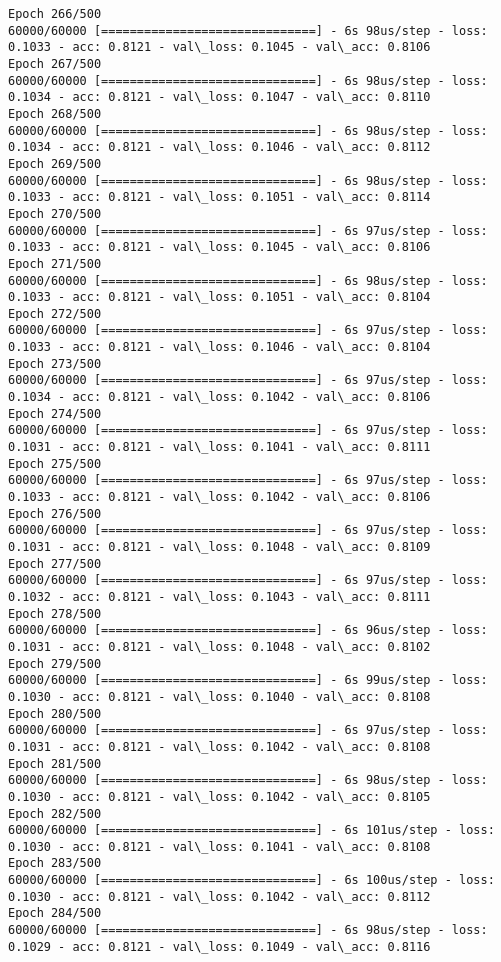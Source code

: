 \documentclass[11pt]{article}
\begin{document}
\begin{Verbatim}[commandchars=\\\{\}]
Epoch 266/500
60000/60000 [==============================] - 6s 98us/step - loss: 0.1033 - acc: 0.8121 - val\_loss: 0.1045 - val\_acc: 0.8106
Epoch 267/500
60000/60000 [==============================] - 6s 98us/step - loss: 0.1034 - acc: 0.8121 - val\_loss: 0.1047 - val\_acc: 0.8110
Epoch 268/500
60000/60000 [==============================] - 6s 98us/step - loss: 0.1034 - acc: 0.8121 - val\_loss: 0.1046 - val\_acc: 0.8112
Epoch 269/500
60000/60000 [==============================] - 6s 98us/step - loss: 0.1033 - acc: 0.8121 - val\_loss: 0.1051 - val\_acc: 0.8114
Epoch 270/500
60000/60000 [==============================] - 6s 97us/step - loss: 0.1033 - acc: 0.8121 - val\_loss: 0.1045 - val\_acc: 0.8106
Epoch 271/500
60000/60000 [==============================] - 6s 98us/step - loss: 0.1033 - acc: 0.8121 - val\_loss: 0.1051 - val\_acc: 0.8104
Epoch 272/500
60000/60000 [==============================] - 6s 97us/step - loss: 0.1033 - acc: 0.8121 - val\_loss: 0.1046 - val\_acc: 0.8104
Epoch 273/500
60000/60000 [==============================] - 6s 97us/step - loss: 0.1034 - acc: 0.8121 - val\_loss: 0.1042 - val\_acc: 0.8106
Epoch 274/500
60000/60000 [==============================] - 6s 97us/step - loss: 0.1031 - acc: 0.8121 - val\_loss: 0.1041 - val\_acc: 0.8111
Epoch 275/500
60000/60000 [==============================] - 6s 97us/step - loss: 0.1033 - acc: 0.8121 - val\_loss: 0.1042 - val\_acc: 0.8106
Epoch 276/500
60000/60000 [==============================] - 6s 97us/step - loss: 0.1031 - acc: 0.8121 - val\_loss: 0.1048 - val\_acc: 0.8109
Epoch 277/500
60000/60000 [==============================] - 6s 97us/step - loss: 0.1032 - acc: 0.8121 - val\_loss: 0.1043 - val\_acc: 0.8111
Epoch 278/500
60000/60000 [==============================] - 6s 96us/step - loss: 0.1031 - acc: 0.8121 - val\_loss: 0.1048 - val\_acc: 0.8102
Epoch 279/500
60000/60000 [==============================] - 6s 99us/step - loss: 0.1030 - acc: 0.8121 - val\_loss: 0.1040 - val\_acc: 0.8108
Epoch 280/500
60000/60000 [==============================] - 6s 97us/step - loss: 0.1031 - acc: 0.8121 - val\_loss: 0.1042 - val\_acc: 0.8108
Epoch 281/500
60000/60000 [==============================] - 6s 98us/step - loss: 0.1030 - acc: 0.8121 - val\_loss: 0.1042 - val\_acc: 0.8105
Epoch 282/500
60000/60000 [==============================] - 6s 101us/step - loss: 0.1030 - acc: 0.8121 - val\_loss: 0.1041 - val\_acc: 0.8108
Epoch 283/500
60000/60000 [==============================] - 6s 100us/step - loss: 0.1030 - acc: 0.8121 - val\_loss: 0.1042 - val\_acc: 0.8112
Epoch 284/500
60000/60000 [==============================] - 6s 98us/step - loss: 0.1029 - acc: 0.8121 - val\_loss: 0.1049 - val\_acc: 0.8116

\end{Verbatim}
\end{document}

